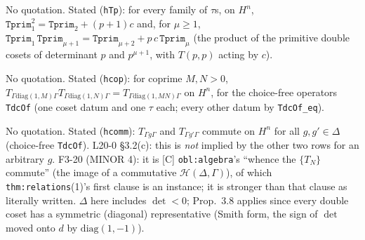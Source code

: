 \begin{hypothesis}\label{lit:hecke-Tp-prim}
   \leanok
  No quotation. Stated (\texttt{hTp}): for every family of $\tau$s, on $H^n$,
  $\mathtt{Tprim}_1^2=\mathtt{Tprim}_2+(p+1)c$ and, for $\mu\ge1$,
  $\mathtt{Tprim}_1\,\mathtt{Tprim}_{\mu+1}=\mathtt{Tprim}_{\mu+2}+p\,c\,\mathtt{Tprim}_\mu$ (the product of the primitive double
  cosets of determinant $p$ and $p^{\mu+1}$, with $T(p,p)$ acting by $c$).
\end{hypothesis}

\begin{hypothesis}\label{lit:hecke-coprime}
   \leanok
  No quotation. Stated (\texttt{hcop}): for coprime $M,N>0$,
  $T_{\Gamma\mathrm{diag}(1,M)\Gamma}T_{\Gamma\mathrm{diag}(1,N)\Gamma}=T_{\Gamma\mathrm{diag}(1,MN)\Gamma}$ on $H^n$, for the choice-free
  operators \texttt{TdcOf} (one coset datum and one $\tau$ each; every other datum by \texttt{TdcOf\_eq}).
\end{hypothesis}

\begin{hypothesis}\label{lit:hecke-commute}
   \leanok
  No quotation. Stated (\texttt{hcomm}): $T_{\Gamma g\Gamma}$ and $T_{\Gamma g'\Gamma}$ commute on $H^n$ for all $g,g'\in\Delta$
  (choice-free \texttt{TdcOf}). L20-0 \S3.2(c): this is \emph{not} implied by the other two rows for an arbitrary $g$. F3-20 (MINOR
  4): it is [C] \texttt{obl:algebra}'s ``whence the $\{T_N\}$ commute'' (the image of a commutative $\mathcal H(\Delta,\Gamma)$), of
  which \texttt{thm:relations}(1)'s first clause is an instance; it is stronger than that clause as literally written. $\Delta$
  here includes $\det<0$; Prop.~3.8 applies since every double coset has a symmetric (diagonal) representative (Smith form, the
  sign of $\det$ moved onto $d$ by $\mathrm{diag}(1,-1)$).
\end{hypothesis}

